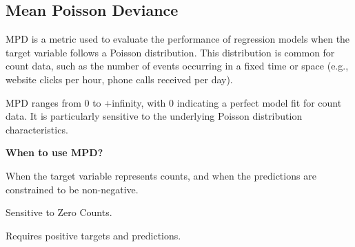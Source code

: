 \subsection{Mean Poisson Deviance}

MPD is a metric used to evaluate the performance of regression models when the target variable follows a Poisson distribution. This distribution is common for count data, such as the number
of events occurring in a fixed time or space (e.g., website clicks per hour, phone calls received per day).

\begin{center}
\end{center}

MPD ranges from 0 to +infinity, with 0 indicating a perfect model fit for count data. It is particularly sensitive to the underlying Poisson distribution characteristics.

\textbf{When to use MPD?}

When the target variable represents counts, and when the predictions are constrained to be non-negative.

{
    \item Sensitive to Zero Counts.
    \item Requires positive targets and predictions.
}

\clearpage
\thispagestyle{customstyle}

